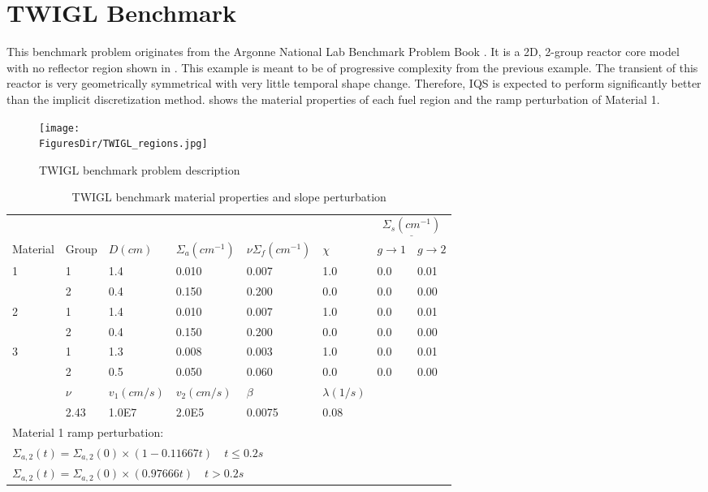 \pagebreak
\section{TWIGL Benchmark}

This benchmark problem originates from the Argonne National Lab Benchmark Problem Book \cite{ANL_BPB}.  It is a 2D, 2-group reactor core model with no reflector region shown in  \cite{TWIGL_benchmark}.  This example is meant to be of progressive complexity from the previous example.  The transient of this reactor is very geometrically symmetrical with very little temporal shape change.  Therefore, IQS is expected to perform significantly better than the implicit discretization method.   shows the material properties of each fuel region and the ramp perturbation of Material 1.

\begin{figure}[!htbp]
\begin{center}
\texttt{[image: \\FiguresDir/TWIGL\_regions.jpg]}
\caption{TWIGL benchmark problem description \cite{Ban_2012}}
\label{fig:TWIGL_reg}
\end{center}
\end{figure}
\begin{table}[!htbp]
\begin{center}
\caption{TWIGL benchmark material properties and slope perturbation \cite{Ban_2012}}
\label{tab:TWIGL_mat}
\begin{tabular}{llllllll}
\hline
  &  &  &  &  &  &  \multicolumn{2}{c}{$\underline{\Sigma_s (cm^{-1})} $} \\
Material & Group & $D (cm)$ & $\Sigma_a (cm^{-1})$ & $\nu\Sigma_f (cm^{-1})$ & $\chi$ & $g \rightarrow 1$ & $g \rightarrow 2$ \\
\hline
1 & 1 & 1.4 & 0.010 & 0.007 & 1.0 & 0.0 & 0.01 \\
  & 2 & 0.4 & 0.150 & 0.200 & 0.0 & 0.0 & 0.00  \\
2 & 1 & 1.4 & 0.010 & 0.007 & 1.0 & 0.0 & 0.01  \\
  & 2 & 0.4 & 0.150 & 0.200 & 0.0 & 0.0 & 0.00  \\
3 & 1 & 1.3 & 0.008 & 0.003 & 1.0 & 0.0 & 0.01  \\
  & 2 & 0.5 & 0.050 & 0.060 & 0.0 & 0.0 & 0.00  \\
\hline
  & $\nu$ & $v_1 (cm/s)$ & $v_2 (cm/s)$ & $\beta$ & $\lambda (1/s)$ &   &   \\
\hline
  & 2.43 & 1.0E7 & 2.0E5 & 0.0075 & 0.08 &   &   \\
\hline
 \multicolumn{8}{l}{\footnotesize Material 1 ramp perturbation:} \\
\multicolumn{8}{l}{\footnotesize $\Sigma_{a,2}(t)=\Sigma_{a,2}(0) \times (1-0.11667t) \quad t \leq 0.2 s$} \\
\multicolumn{8}{l}{\footnotesize $\Sigma_{a,2}(t)=\Sigma_{a,2}(0) \times (0.97666t) \quad t > 0.2 s$} \normalsize
\end{tabular}
\end{center}
\end{table}


